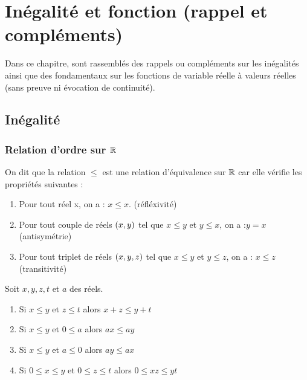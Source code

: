 \chapter{Inégalité et fonction (rappel et compléments)}

\minitoc

Dans ce chapitre, sont rassemblés des rappels ou compléments sur les inégalités ainsi que des fondamentaux sur les fonctions de variable réelle à valeurs réelles (sans preuve ni évocation de continuité).

\section{Inégalité}

\subsection{Relation d'ordre sur \(\mathbb{R}\)}

\begin{defi}
	On dit que la relation \(\leq\) est une relation d'équivalence sur \(\mathbb{R}\) car elle vérifie les propriétés suivantes :
	\begin{enumerate}
		\item Pour tout réel x, on a : \(x \leq x \). \hfill (réfléxivité)
		\item Pour tout couple de réels \(\left(x,y\right)\) tel que \( x \leq y  \) et \(y \leq x\), on a :\( y = x  \) \hfill (antisymétrie)
		\item Pour tout triplet de réels \(\left(x,y,z\right)\) tel que \(x \leq y  \) et \( y \leq z  \), on a : \( x \leq z  \) \hfill (transitivité)
	\end{enumerate}
\end{defi}

\begin{prop}
	Soit \(x,y,z,t\) et \(a\) des réels.
	\begin{enumerate}
		\item Si \(x\leq y\) et \(z\leq t\) alors \(x+z\leq y +t \)
		\item Si \(x\leq y \) et \( 0 \leq a\) alors \(a x \leq a y\)
		\item Si \(x\leq y \) et \( a \leq 0\) alors \(a y \leq a x\)
		\item Si \( 0 \leq x \leq y \) et \( 0\leq z \leq t \) alors \( 0 \leq xz \leq y t \)
	\end{enumerate}
\end{prop}

